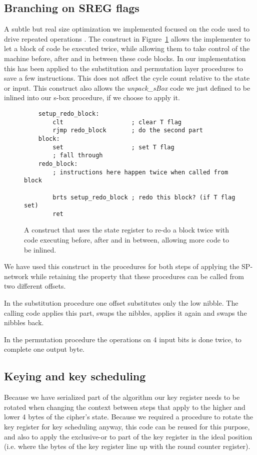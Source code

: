 \documentclass{llncs}
\begin{document}
\subsection{Branching on SREG flags}
A subtle but real size optimization we implemented focused on the code used to drive repeated operations .
The construct in Figure~\ref{sreg_redo} allows the implementer to let a block of code be executed twice, while allowing them to take control of the machine before, after and in between these code blocks.
In our implementation this has been applied to the substitution and permutation layer procedures to save a few instructions.
This does not affect the cycle count relative to the state or input.
This construct also allows the \textit{unpack\_sBox} code we just defined to be inlined into our s-box procedure, if we choose to apply it.

\begin{figure}
	\begin{lstlisting}
	setup_redo_block:
		clt                   ; clear T flag
		rjmp redo_block       ; do the second part
	block:
		set                   ; set T flag
		; fall through
	redo_block:
		; instructions here happen twice when called from block

		brts setup_redo_block ; redo this block? (if T flag set)
		ret
	\end{lstlisting}
	\caption{A construct that uses the state register to re-do a block twice with code executing before, after and in between, allowing more code to be inlined.}
\label{sreg_redo}
\end{figure}

We have used this construct in the procedures for both steps of applying the SP-network while retaining the property that these procedures can be called from two different offsets.

In the substitution procedure one offset substitutes only the low nibble.
The calling code applies this part, swaps the nibbles, applies it again and swaps the nibbles back.

In the permutation procedure the operations on 4 input bits is done twice, to complete one output byte.

\subsection{Keying and key scheduling}
Because we have serialized part of the algorithm our key register needs to be rotated when changing the context between steps that apply to the higher and lower 4 bytes of the cipher's state.
Because we required a procedure to rotate the key register for key scheduling anyway, this code can be reused for this purpose, and also to apply the exclusive-or to part of the key register in the ideal position (i.e. where the bytes of the key register line up with the round counter register).
\end{document}
